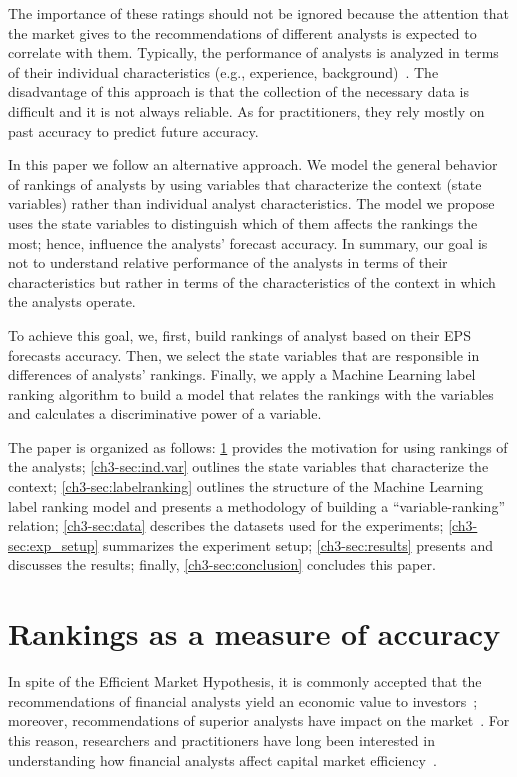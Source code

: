 \documentclass[a4paper,twoside,12pt,openright,notitlepage]{report}\usepackage[]{graphicx}\usepackage[]{color}
\begin{document}
The importance of these ratings should not be ignored because the attention that the market gives to the recommendations of different analysts is expected to correlate with them. Typically, the performance of analysts is analyzed in terms of their individual characteristics (e.g., experience, background)~\citep{clement1999}. The disadvantage of this approach is that the collection of the necessary data is difficult and it is not always reliable. As for practitioners, they rely mostly on past accuracy to predict future accuracy.

In this paper we follow an alternative approach.  We model the general behavior of rankings of analysts by using variables that characterize the context (state variables) rather than individual analyst characteristics. The model we propose uses the state variables to distinguish which of them  affects the rankings the most; hence, influence the analysts' forecast accuracy. In summary, our goal is not to understand  relative performance of the analysts  in terms of their characteristics but rather in terms of the characteristics of the context in which the analysts operate.


To achieve this goal, we, first, build rankings of analyst based on their EPS forecasts accuracy. Then, we select the state variables that  are responsible in differences of analysts' rankings. Finally, we apply a Machine Learning label ranking algorithm to build a model that relates the rankings with the variables and calculates  a discriminative power of a variable.

The paper is organized as follows: \ref{ch3-sec:ranking} provides the motivation for using rankings of the analysts; \ref{ch3-sec:ind.var} outlines the state variables that characterize the context; \ref{ch3-sec:labelranking} outlines the structure of the Machine Learning label ranking model and presents a methodology of building a ``variable-ranking'' relation; \ref{ch3-sec:data} describes the datasets used for the experiments; \ref{ch3-sec:exp_setup} summarizes the experiment setup;  \ref{ch3-sec:results} presents and discusses the results; finally, \ref{ch3-sec:conclusion} concludes this paper.


\section{Rankings as a measure of accuracy}
\label{ch3-sec:ranking}
In spite of the Efficient Market Hypothesis, it is commonly accepted that the recommendations of financial analysts yield an economic value to investors~\citep{womack1996}; moreover, recommendations of superior analysts have impact on the market~\citep{loh2011}. For this reason, researchers and practitioners have long been interested in understanding how financial analysts affect capital market efficiency~\citep{ramnath2008faf}.
\end{document}
